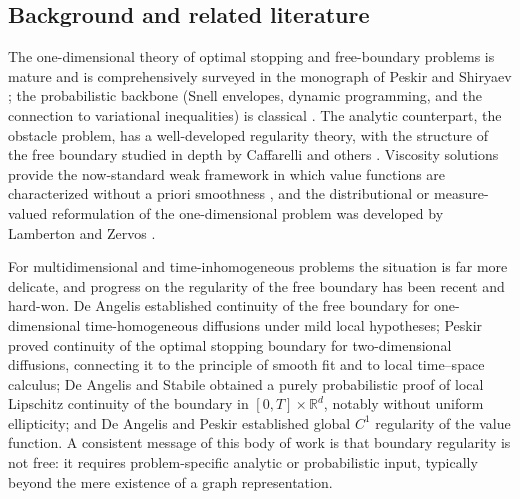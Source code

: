 \documentclass[pdflatex,sn-mathphys-num]{sn-jnl}
\theoremstyle{plain}
\theoremstyle{definition}
\newcommand{\R}{\mathbb{R}}
\begin{document}
\subsection{Background and related literature}
\label{sec:intro-literature}
The one-dimensional theory of optimal stopping and free-boundary problems is
mature and is comprehensively surveyed in the monograph of Peskir and
Shiryaev \cite{peskir2006optimal}; the probabilistic backbone (Snell
envelopes, dynamic programming, and the connection to variational
inequalities) is classical \cite{el2006aspects,bensoussan2011applications,friedman1982variational,jacka2019compensator,martyr2016finite,christensen2021class,ma2021dynamic,ankirchner2019verification,liu2025bidirectional,lv2026robust,jeon2023variational}.
The analytic counterpart, the obstacle problem, has a well-developed
regularity theory, with the structure of the free boundary studied in depth
by Caffarelli \cite{caffarelli1998obstacle} and others \cite{caffarelli2008regularity,yu2026beyond,figalli2024constraint,liang2025global,focardi2022local,huang2024regularity,du2026free,aleksanyan2024quantitative,eberle2023structure,yu2026rigorous}. Viscosity solutions provide
the now-standard weak framework in which value functions are characterized
without a priori smoothness \cite{wang2026damage,crandall1992user,soner2024viscosity,cheng2025viscosity,wang2026algebraic}, and the
distributional or measure-valued reformulation of the one-dimensional problem
was developed by Lamberton and Zervos \cite{lamberton2013optimal}.

For multidimensional and time-inhomogeneous problems the situation is far more
delicate, and progress on the regularity of the free boundary has been recent
and hard-won. De Angelis \cite{de2015note} established continuity of the
free boundary for one-dimensional time-homogeneous diffusions under mild local
hypotheses; Peskir \cite{peskir2019continuity} proved continuity of the optimal stopping
boundary for two-dimensional diffusions, connecting it to the principle of
smooth fit and to local time--space calculus; De Angelis and Stabile
\cite{de2019lipschitz} obtained a purely probabilistic proof of local
Lipschitz continuity of the boundary in $[0,T]\times\R^d$, notably without
uniform ellipticity; and De Angelis and Peskir \cite{de2020global}
established global $C^1$ regularity of the value function. A consistent
message of this body of work is that boundary regularity is not free: it
requires problem-specific analytic or probabilistic input, typically beyond
the mere existence of a graph representation.
\end{document}
